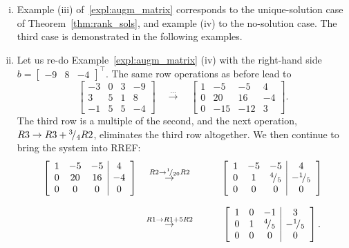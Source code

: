 \begin{example}
\label{expl:systems_of_eqns}
\begin{enumerate}[(i)]
	\item Example (iii) of~\ref{expl:augm_matrix} corresponds to the unique-solution case of Theorem~\ref{thm:rank_sols}, and example (iv) to the no-solution case. The third case is demonstrated in the following examples.
	\item Let us re-do Example~\ref{expl:augm_matrix} (iv) with the right-hand side 
	$b = \begin{bmatrix} -9 & 8 & -4 \end{bmatrix}^\top.$
	The same row operations as before lead to
\[	\left[\begin{array}{ccc|c}
			-3 & 0 & 3 & -9 \\
			3  & 5 & 1 & 8 \\
			-1 & 5 & 5 & -4 
	\end{array}\right] \quad \stackrel{\dots}{\rightarrow} \quad \left[ \begin{array}{ccc|c}
			1 & -5 & -5 & 4 \\
			0 & 20 & 16 &  -4 \\
			0 & -15 & -12 & 3 
		\end{array}\right]. \]
	The third row is a multiple of the second, and the next operation, $R3 \rightarrow R3 + {}^{3}\!/_{4} R2$, eliminates the third row altogether. We then continue to bring the system into RREF:
	\[\begin{array}{ccc}
		\left[\begin{array}{ccc|c}
			1 & -5 & -5 & 4 \\
			0  & 20 & 16 & -4 \\
			0 & 0 & 0 & 0 
		\end{array}\right] & \stackrel{R2 \rightarrow {}^{1}\!/_{20}R2}{\rightarrow} \qquad & \left[\begin{array}{ccc|c}
			1 & -5 & -5 & 4 \\
			0 & 1 & {}^{4}\!/_{5} & -{}^{1}\!/_{5} \\
			0 & 0 & 0 & 0 
		\end{array}\right] \\ & & \\
		& \stackrel{R1 \rightarrow R1 + 5 R2}{\rightarrow} \qquad & \left[\begin{array}{ccc|c}
			1 & 0 & -1 & 3 \\
			0 & 1 & {}^{4}\!/_{5} & -{}^{1}\!/_{5} \\
			0 & 0 & 0 & 0 
		\end{array}\right]. 

\end{array}\]
\end{enumerate}
\end{example}
